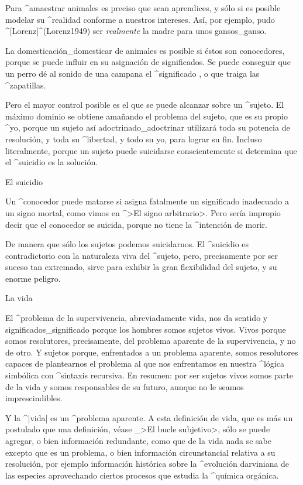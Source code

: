 Para ^{amaestrar} animales es preciso que sean aprendices, y sólo si es
posible modelar su ^{realidad} conforme a nuestros intereses. Así, por
ejemplo, pudo ^[Lorenz]^(Lorenz1949) ser {\em realmente} la madre para
unos gansos_{ganso}.

La domesticación_{domesticar} de animales es posible si éstos son
conocedores, porque se puede influir en su asignación de significados.
Se puede conseguir que un perro dé al sonido de una campana el
^{significado} , o que traiga las ^{zapatillas}.

Pero el mayor control posible es el que se puede alcanzar sobre un
^{sujeto}. El máximo dominio se obtiene amañando el problema del sujeto,
que es su propio ^{yo}, porque un sujeto así adoctrinado_{adoctrinar}
utilizará toda su potencia de resolución, y toda su ^{libertad}, y todo
su yo, para lograr su fin. Incluso literalmente, porque un sujeto puede
suicidarse conscientemente si determina que el ^{suicidio} es la
solución.


\Section El suicidio

Un ^{conocedor} puede matarse si asigna fatalmente un significado
inadecuado a un signo mortal, como vimos en ^>El signo arbitrario>. Pero
sería impropio decir que el conocedor se suicida, porque no tiene la
^{intención} de morir.

De manera que sólo los sujetos podemos suicidarnos. El ^{suicidio} es
contradictorio con la naturaleza viva del ^{sujeto}, pero, precisamente
por ser suceso tan extremado, sirve para exhibir la gran flexibilidad
del sujeto, y su enorme peligro.


\Section La vida

El ^{problema de la supervivencia}, abreviadamente vida, nos da sentido
y significados_{significado} porque los hombres somos sujetos vivos.
Vivos porque somos resolutores, precisamente, del problema aparente de
la supervivencia, y no de otro. Y sujetos porque, enfrentados a un
problema aparente, somos resolutores capaces de plantearnos el problema
al que nos enfrentamos en nuestra ^{lógica simbólica} con ^{sintaxis}
recursiva. En resumen: por ser sujetos vivos somos parte de la vida y
somos responsables de su futuro, aunque no le seamos imprescindibles.

Y la ^|vida| es un ^{problema aparente}. A esta definición de vida, que
es más un postulado que una definición, véase _>El bucle subjetivo>,
sólo se puede agregar, o bien información redundante, como que de la
vida nada se sabe excepto que es un problema, o bien información
circunstancial relativa a su resolución, por ejemplo información
histórica sobre la ^{evolución} darviniana de las especies aprovechando
ciertos procesos que estudia la ^{química orgánica}.

